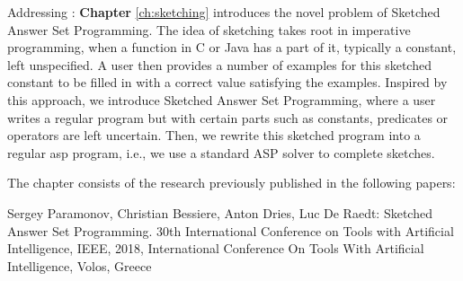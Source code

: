 
Addressing \cthree:  \textbf{Chapter} \ref{ch:sketching} introduces the novel problem of
Sketched Answer Set Programming. The idea of sketching takes root in
imperative programming, when a function in C or Java has a part of it,
typically a constant, left unspecified. A user then provides a number
of examples for this sketched constant to be filled in with a
correct value satisfying the examples. Inspired by this approach, we
introduce Sketched Answer Set Programming, where a user writes a
regular program but with certain parts such as constants, predicates
or operators are left uncertain. Then, we rewrite this sketched
program into a regular \acrlong{asp} program, i.e., we use a standard ASP solver
to complete sketches.


The chapter consists of the research previously published in the following papers:
\pubrev
\begin{addmargin}[2em]{2em}
  Sergey Paramonov, Christian Bessiere, Anton Dries, Luc De Raedt:
  Sketched Answer Set Programming. 30th International Conference on Tools with Artificial Intelligence, IEEE, 2018, International Conference On Tools With Artificial Intelligence, Volos, Greece 
\end{addmargin}
\pubrevend





